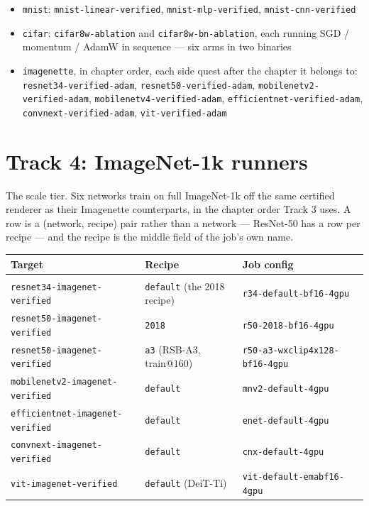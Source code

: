 \begin{itemize}
  \item \texttt{mnist}: \texttt{mnist-linear-verified},
    \texttt{mnist-mlp-verified}, \texttt{mnist-cnn-verified}
  \item \texttt{cifar}: \texttt{cifar8w-ablation} and
    \texttt{cifar8w-bn-ablation}, each running SGD / momentum / AdamW in
    sequence --- six arms in two binaries
  \item \begingroup\raggedright \texttt{imagenette}, in chapter order, each side
    quest after the chapter it belongs to: \texttt{resnet34-verified-adam},
    \texttt{resnet50-verified-adam}, \texttt{mobilenetv2-verified-adam},
    \texttt{mobilenetv4-verified-adam}, \texttt{efficientnet-verified-adam},
    \texttt{convnext-verified-adam}, \texttt{vit-verified-adam}\par\endgroup
\end{itemize}

\section*{Track 4: ImageNet-1k runners}
\label{sec:getting_started_track4}

The scale tier. Six networks train on full ImageNet-1k off the same certified
renderer as their Imagenette counterparts, in the chapter order Track 3
uses. A row is a (network, recipe) pair rather than a network --- ResNet-50 has
a row per recipe --- and the recipe is the middle field of the job's own
name.

\begin{center}
\begin{tabular}{@{}lll@{}}
\textbf{Target} & \textbf{Recipe} & \textbf{Job config} \\[2pt]
\hline \\[-6pt]
\texttt{resnet34-imagenet-verified}     & \texttt{default} (the 2018 recipe) & \texttt{r34-default-bf16-4gpu} \\
\texttt{resnet50-imagenet-verified}     & \texttt{2018}                      & \texttt{r50-2018-bf16-4gpu} \\
\texttt{resnet50-imagenet-verified}     & \texttt{a3} (RSB-A3, train@$160$)  & \texttt{r50-a3-wxclip4x128-bf16-4gpu} \\
\texttt{mobilenetv2-imagenet-verified}  & \texttt{default}                   & \texttt{mnv2-default-4gpu} \\
\texttt{efficientnet-imagenet-verified} & \texttt{default}                   & \texttt{enet-default-4gpu} \\
\texttt{convnext-imagenet-verified}     & \texttt{default}                   & \texttt{cnx-default-4gpu} \\
\texttt{vit-imagenet-verified}          & \texttt{default} (DeiT-Ti)         & \texttt{vit-default-emabf16-4gpu} \\
\end{tabular}
\end{center}

